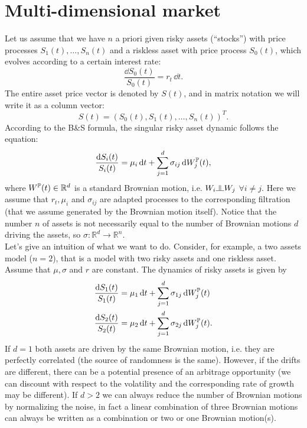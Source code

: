 \section{Multi-dimensional market} %
Let us assume that we have $n$ a priori given risky assets (“stocks”) with price processes $S_1(t),\dots,S_n(t)$ and a riskless asset with price process $S_0(t)$, which evolves according to a certain interest rate:
\begin{equation}
    \dfrac{\dd S_0(t)}{S_0(t)} = r_t\,\dd t.
\end{equation}
The entire asset price vector is denoted by $S(t)$, and in matrix notation we will write it as a column vector:
\begin{equation}
    S(t) = (S_0(t), S_1(t),\dots,S_n(t))^T.
\end{equation}
According to the B\&S formula, the singular risky asset dynamic follows the equation:
\begin{equation}
    \dfrac{\dd S_i(t)}{S_i(t)} = \mu_i\,\dd t + \sum^d_{j=1}\sigma_{ij}\,\dd W_j^{\mathbb{P}}(t),
\end{equation}
where $W^{\mathbb{P}}(t)\in\mathbb{R}^d$ is a standard Brownian motion, i.e. $W_i\indep W_j$ $\forall i\ne j$. Here we assume that $r_t, \mu_i$ and $\sigma_{ij}$ are adapted processes to the corresponding filtration (that we assume generated by the Brownian motion itself). Notice that the number $n$ of assets is not necessarily equal to the number of Brownian motions $d$ driving the assets, so $\sigma:\mathbb{R}^d\to\mathbb{R}^n$.\\
Let's give an intuition of what we want to do. Consider, for example, a two assets model ($n=2$), that is a model with two risky assets and one riskless asset. Assume that $\mu,\sigma$ and $r$ are constant. The dynamics of risky assets is given by
\begin{align}\label{bm}
    \dfrac{\dd S_1(t)}{S_1(t)} &= \mu_1\,\dd t + \sum^d_{j=1}\sigma_{1j}\,\dd W_j^{\mathbb{P}}(t) \\
    \dfrac{\dd S_2(t)}{S_2(t)} &= \mu_2\,\dd t + \sum^d_{j=1}\sigma_{2j}\,\dd W_j^{\mathbb{P}}(t).
\end{align}
If $d=1$ both assets are driven by the same Brownian motion, i.e. they are perfectly correlated (the source of randomness is the same). However, if the drifts are different, there can be a potential presence of an arbitrage opportunity (we can discount with respect to the volatility and the corresponding rate of growth may be different). If $d>2$ we can always reduce the number of Brownian motions by normalizing the noise, in fact a linear combination of three Brownian motions can always be written as a combination or two or one Brownian motion(s).
